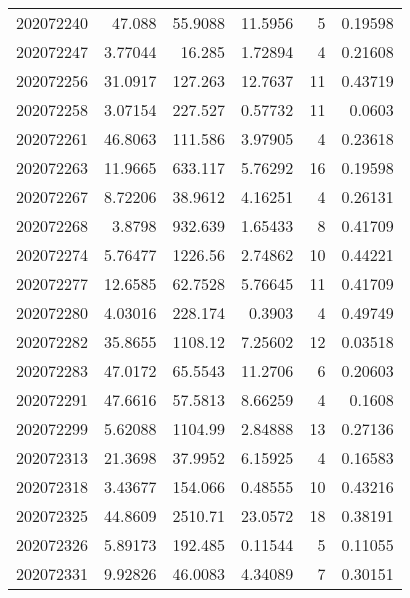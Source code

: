\begin{tabular}{rrrrrr}
 202072240 &         47.088   &       55.9088 &           11.5956  &           5 & 0.19598 \\
 202072247 &          3.77044 &       16.285  &            1.72894 &           4 & 0.21608 \\
 202072256 &         31.0917  &      127.263  &           12.7637  &          11 & 0.43719 \\
 202072258 &          3.07154 &      227.527  &            0.57732 &          11 & 0.0603  \\
 202072261 &         46.8063  &      111.586  &            3.97905 &           4 & 0.23618 \\
 202072263 &         11.9665  &      633.117  &            5.76292 &          16 & 0.19598 \\
 202072267 &          8.72206 &       38.9612 &            4.16251 &           4 & 0.26131 \\
 202072268 &          3.8798  &      932.639  &            1.65433 &           8 & 0.41709 \\
 202072274 &          5.76477 &     1226.56   &            2.74862 &          10 & 0.44221 \\
 202072277 &         12.6585  &       62.7528 &            5.76645 &          11 & 0.41709 \\
 202072280 &          4.03016 &      228.174  &            0.3903  &           4 & 0.49749 \\
 202072282 &         35.8655  &     1108.12   &            7.25602 &          12 & 0.03518 \\
 202072283 &         47.0172  &       65.5543 &           11.2706  &           6 & 0.20603 \\
 202072291 &         47.6616  &       57.5813 &            8.66259 &           4 & 0.1608  \\
 202072299 &          5.62088 &     1104.99   &            2.84888 &          13 & 0.27136 \\
 202072313 &         21.3698  &       37.9952 &            6.15925 &           4 & 0.16583 \\
 202072318 &          3.43677 &      154.066  &            0.48555 &          10 & 0.43216 \\
 202072325 &         44.8609  &     2510.71   &           23.0572  &          18 & 0.38191 \\
 202072326 &          5.89173 &      192.485  &            0.11544 &           5 & 0.11055 \\
 202072331 &          9.92826 &       46.0083 &            4.34089 &           7 & 0.30151 \\

\end{tabular}
